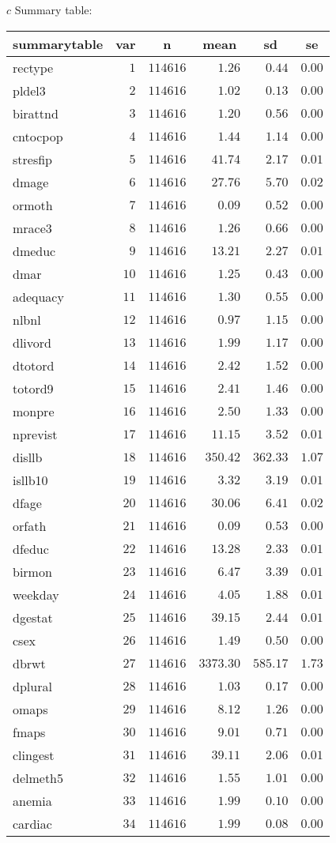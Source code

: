 \documentclass[a4paper, 12pt]{article}
\begin{document}
\(c\) Summary table:
%
\begin{table}[!tbp]
\begin{center}
\begin{tabular}{lrrrrr}
\hline\hline
\multicolumn{1}{l}{summarytable}&\multicolumn{1}{c}{var}&\multicolumn{1}{c}{n}&\multicolumn{1}{c}{mean}&\multicolumn{1}{c}{sd}&\multicolumn{1}{c}{se}\tabularnewline
\hline
rectype&$ 1$&$114616$&$   1.26$&$  0.44$&$0.00$\tabularnewline
pldel3&$ 2$&$114616$&$   1.02$&$  0.13$&$0.00$\tabularnewline
birattnd&$ 3$&$114616$&$   1.20$&$  0.56$&$0.00$\tabularnewline
cntocpop&$ 4$&$114616$&$   1.44$&$  1.14$&$0.00$\tabularnewline
stresfip&$ 5$&$114616$&$  41.74$&$  2.17$&$0.01$\tabularnewline
dmage&$ 6$&$114616$&$  27.76$&$  5.70$&$0.02$\tabularnewline
ormoth&$ 7$&$114616$&$   0.09$&$  0.52$&$0.00$\tabularnewline
mrace3&$ 8$&$114616$&$   1.26$&$  0.66$&$0.00$\tabularnewline
dmeduc&$ 9$&$114616$&$  13.21$&$  2.27$&$0.01$\tabularnewline
dmar&$10$&$114616$&$   1.25$&$  0.43$&$0.00$\tabularnewline
adequacy&$11$&$114616$&$   1.30$&$  0.55$&$0.00$\tabularnewline
nlbnl&$12$&$114616$&$   0.97$&$  1.15$&$0.00$\tabularnewline
dlivord&$13$&$114616$&$   1.99$&$  1.17$&$0.00$\tabularnewline
dtotord&$14$&$114616$&$   2.42$&$  1.52$&$0.00$\tabularnewline
totord9&$15$&$114616$&$   2.41$&$  1.46$&$0.00$\tabularnewline
monpre&$16$&$114616$&$   2.50$&$  1.33$&$0.00$\tabularnewline
nprevist&$17$&$114616$&$  11.15$&$  3.52$&$0.01$\tabularnewline
disllb&$18$&$114616$&$ 350.42$&$362.33$&$1.07$\tabularnewline
isllb10&$19$&$114616$&$   3.32$&$  3.19$&$0.01$\tabularnewline
dfage&$20$&$114616$&$  30.06$&$  6.41$&$0.02$\tabularnewline
orfath&$21$&$114616$&$   0.09$&$  0.53$&$0.00$\tabularnewline
dfeduc&$22$&$114616$&$  13.28$&$  2.33$&$0.01$\tabularnewline
birmon&$23$&$114616$&$   6.47$&$  3.39$&$0.01$\tabularnewline
weekday&$24$&$114616$&$   4.05$&$  1.88$&$0.01$\tabularnewline
dgestat&$25$&$114616$&$  39.15$&$  2.44$&$0.01$\tabularnewline
csex&$26$&$114616$&$   1.49$&$  0.50$&$0.00$\tabularnewline
dbrwt&$27$&$114616$&$3373.30$&$585.17$&$1.73$\tabularnewline
dplural&$28$&$114616$&$   1.03$&$  0.17$&$0.00$\tabularnewline
omaps&$29$&$114616$&$   8.12$&$  1.26$&$0.00$\tabularnewline
fmaps&$30$&$114616$&$   9.01$&$  0.71$&$0.00$\tabularnewline
clingest&$31$&$114616$&$  39.11$&$  2.06$&$0.01$\tabularnewline
delmeth5&$32$&$114616$&$   1.55$&$  1.01$&$0.00$\tabularnewline
anemia&$33$&$114616$&$   1.99$&$  0.10$&$0.00$\tabularnewline
cardiac&$34$&$114616$&$   1.99$&$  0.08$&$0.00$\tabularnewline

\end{tabular}
\end{center}
\end{table}
\end{document}
